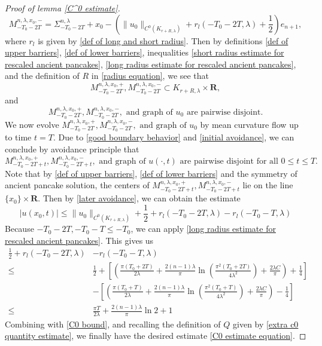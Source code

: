 \documentclass[10pt,a4paper]{amsart}
\begin{document}
\begin{proof}[Proof of lemma \ref{C^0 estimate}]
\begin{equation}
    M^{n, \lambda, x_0, -}_{-T_0 - 2T } = \Sigma^{n, \lambda}_{-T_0 -2T}  + x_0 - (\|u_0\|_{C^0(K_{r + R, \lambda})} + r_l(-T_0-2T, \lambda) + \frac{1}{2})e_{n+1},
\end{equation}
where $r_l$ is given by \eqref{def of long and short radius}. 
Then by definitions \eqref{def of upper barriers}, \eqref{def of lower barriers}, inequalities \eqref{short radius estimate for rescaled ancient pancakes}, \eqref{long radius estimate for rescaled ancient pancakes}, and the definition of $R$ in \eqref{radius equation}, we see that
\begin{equation}\label{good boundary behavior}
    M^{n, \lambda, x_0,+}_{-T_0 - 2T},M^{n, \lambda, x_0,-}_{-T_0 - 2T} \subset K_{r + R, \lambda} \times \mathbf{R},
\end{equation}
and 
\begin{equation}\label{initial avoidance}
     M^{n, \lambda, x_0,+}_{-T_0 - 2T},M^{n, \lambda, x_0,-}_{-T_0 - 2T}, \text{ and graph of }u_0 \text{ are pairwise disjoint}.
\end{equation}
We now evolve $M^{n, \lambda, x_0,+}_{-T_0 - 2T},M^{n, \lambda, x_0,-}_{-T_0 - 2T}, \text{ and graph of }u_0$ by mean curvature flow up to time $t = T$. Due to \eqref{good boundary behavior} and \eqref{initial avoidance}, we can conclude by avoidance principle that  
\begin{equation}\label{later avoidance}
     M^{n, \lambda, x_0,+}_{-T_0 - 2T + t},M^{n, \lambda, x_0,-}_{-T_0 - 2T+ t}, \text{ and graph of }u(\cdot, t) \text{ are pairwise disjoint for all }0 \leq t \leq T.
\end{equation}
Note that by \eqref{def of upper barriers}, \eqref{def of lower barriers} and the symmetry of ancient pancake solution, the centers of $M^{n, \lambda, x_0,+}_{-T_0 - 2T + t},M^{n, \lambda, x_0,-}_{-T_0 - 2T+ t}$ lie on the line $\{x_0\} \times \mathbf{R}$. Then by \eqref{later avoidance}, we can obtain the estimate
\begin{equation}\label{C0 bound}
    |u(x_0, t)| \leq \|u_0\|_{C^0(K_{ r + R, \lambda})} + \frac{1}{2} + r_l(-T_0 - 2T, \lambda) - r_l(-T_0 -T, \lambda)
\end{equation}
Because $-T_0 - 2T, -T_0 - T \leq -T_0$, we can apply \eqref{long radius estimate for rescaled ancient pancakes}. This gives us 
\begin{align*}
        \frac{1}{2} + r_l(-T_0 - 2T, \lambda) &- r_l(-T_0 -T, \lambda)  \\ \leq &\frac{1}{2} + [(\frac{\pi (T_0 + 2T)}{2\lambda}+ \frac{2(n-1)\lambda}{\pi}\ln(\frac{\pi^2(T_0 + 2T)}{4\lambda^2}) + \frac{2\lambda C}{\pi}) + \frac{1}{4}]\\ & - [(\frac{\pi (T_0 + T)}{2\lambda}+ \frac{2(n-1)\lambda}{\pi}\ln(\frac{\pi^2(T_0 + T)}{4\lambda^2}) + \frac{2\lambda C}{\pi}) - \frac{1}{4}]\\ \leq & \frac{\pi T}{2\lambda} + \frac{2(n-1)\lambda}{\pi}\ln 2 + 1
\end{align*}
Combining with \eqref{C0 bound}, and recalling the definition of $Q$ given by \eqref{extra c0 quantity estimate}, we finally have the desired estimate \eqref{C0 estimate equation}.
\end{proof}
\end{document}

